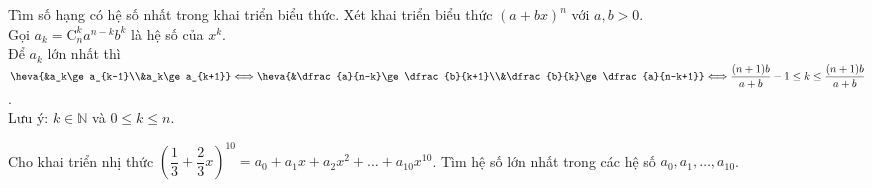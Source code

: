 \begin{dang}{Tìm số hạng có hệ số nhất trong khai triển biểu thức.}%
Xét khai triển biểu thức $\left(a+bx\right)^n$ với $a,b>0$.\\
Gọi $a_k=\mathrm{C}_n^ka^{n-k}b^k$ là hệ số của $x^k$.\\
Để $a_k$ lớn nhất thì $\heva{&a_k\ge a_{k-1}\\&a_k\ge a_{k+1}}\Longleftrightarrow \heva{&\dfrac{a}{n-k}\ge \dfrac{b}{k+1}\\&\dfrac{b}{k}\ge \dfrac{a}{n-k+1}}\Longleftrightarrow \dfrac{(n+1)b}{a+b}-1\le k \le \dfrac{(n+1)b}{a+b}$.\\
Lưu ý: $k \in \mathbb{N}$ và $0\le k \le n$.
\end{dang}
\begin{vd}%
Cho khai triển nhị thức $\left(\dfrac{1}{3}  +  \dfrac{2}{3}x\right)^{10}=a_0+a_1x+a_2x^2+\ldots+a_{10}x^{10}$. Tìm hệ số lớn nhất trong các hệ số $a_0, a_1, \ldots, a_{10}$.
\end{vd}

